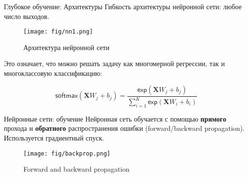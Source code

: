 \documentclass[handout]{beamer}
\begin{document}
\begin{frame}{Глубокое обучение: Архитектуры}
	Гибкость архитектуры нейронной сети: любое число выходов.

	\begin{figure}
	    \texttt{[image: fig/nn1.png]}
	    \caption{\small Архитектура нейронной сети
	    } 
	    \label{fig:w_series}
	\end{figure}
	\vspace*{-12pt}
	Это означает, что можно решать задачу как многомерной регрессии, так и многоклассовую классификацию:

	\begin{equation*}
		\mathsf{softmax}(\mathbf{X}W_j+b_j)=\frac{\mathsf{exp}(\mathbf{X}W_j+b_j)}{\sum_{i=1}^K\mathsf{exp}(\mathbf{X}W_i+b_i)}
	\end{equation*}
\end{frame}

\begin{frame}{Нейронные сети: обучение}
	Нейронная сеть обучается с помощью \textbf{прямого} прохода и \textbf{обратного} распространения ошибки (forward/backward propagation). Используется градиентный спуск.
	\begin{figure}
	    \texttt{[image: fig/backprop.png]}
	    \caption{\small Forward and backward propagation
	    } 
	    \label{fig:w_series}
	\end{figure}
\end{frame}
\end{document}
